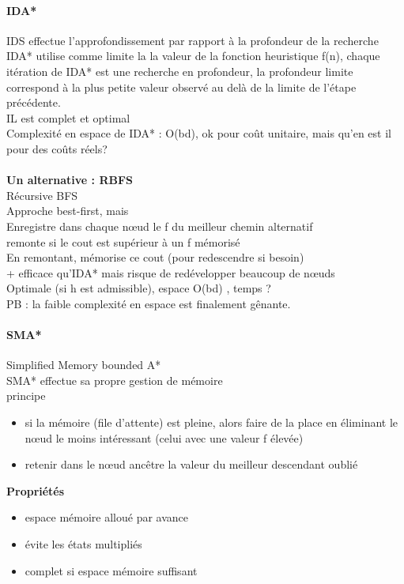 \documentclass{article}
\begin{document}
\paragraph{IDA*} IDS effectue l'approfondissement par rapport à la profondeur de la recherche\\IDA* utilise comme limite la la valeur de la fonction heuristique f(n), chaque itération de IDA* est une recherche en profondeur, la profondeur limite correspond à la plus petite valeur observé au delà de la limite de l'étape précédente.\\IL est complet et optimal\\Complexité en espace de IDA* : O(bd), ok pour coût unitaire, mais qu'en est il pour des coûts réels? \\\\\textbf{Un alternative : RBFS}\\Récursive  BFS\\Approche best-first, mais\\Enregistre dans chaque nœud le f du meilleur chemin alternatif\\remonte si le cout est supérieur à un f mémorisé\\En remontant, mémorise ce cout (pour redescendre si besoin)\\+ efficace qu'IDA* mais risque de redévelopper beaucoup de nœuds\\Optimale (si h est admissible), espace O(bd) , temps ?\\PB : la faible complexité en espace est finalement gênante.
\paragraph{SMA*} Simplified Memory bounded A*\\SMA* effectue sa propre gestion de mémoire\\principe \begin{itemize}
\item si la mémoire (file d'attente) est pleine, alors faire de la place en éliminant le nœud le moins intéressant (celui avec une valeur f élevée)
\item retenir dans le nœud ancêtre la valeur du meilleur descendant oublié

\end{itemize}
\textbf{Propriétés} 
\begin{itemize}
\item espace mémoire alloué par avance
\item évite les états multipliés
\item complet si espace mémoire suffisant
\end{itemize}
\end{document}
